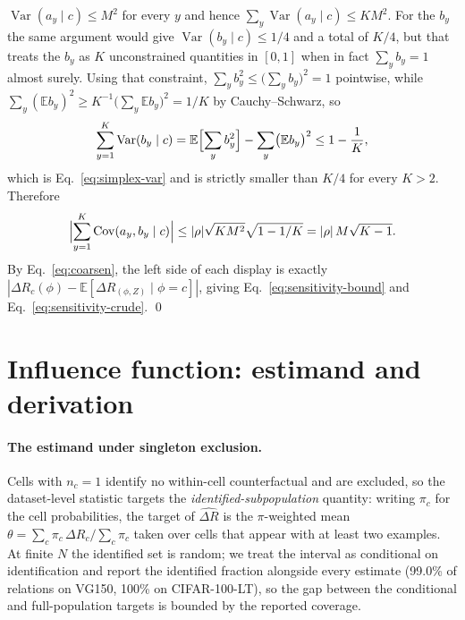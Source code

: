 \documentclass[preprint,times,10pt,a4paper]{elsarticle}
\theoremstyle{plain}
\theoremstyle{definition}
\begin{document}
$\operatorname{Var}(a_y\mid c)\le M^2$ for every $y$ and hence
$\sum_y\operatorname{Var}(a_y\mid c)\le KM^2$. For the $b_y$ the same argument would give
$\operatorname{Var}(b_y\mid c)\le1/4$ and a total of $K/4$, but that treats the $b_y$ as
$K$ unconstrained quantities in $[0,1]$ when in fact $\sum_yb_y=1$ almost surely. Using
that constraint, $\sum_yb_y^2\le\bigl(\sum_yb_y\bigr)^2=1$ pointwise, while
$\sum_y(\mathbb E b_y)^2\ge K^{-1}\bigl(\sum_y\mathbb E b_y\bigr)^2=1/K$ by
Cauchy--Schwarz, so
\[
\sum_{y=1}^K\operatorname{Var}(b_y\mid c)
=\mathbb E\Bigl[\sum_yb_y^2\Bigr]-\sum_y\bigl(\mathbb E b_y\bigr)^2\le1-\frac1K,
\]
which is Eq.~\eqref{eq:simplex-var} and is strictly smaller than $K/4$ for every $K>2$.
Therefore
\[
\Bigl|\sum_{y=1}^K\operatorname{Cov}(a_y,b_y\mid c)\Bigr|
\le|\rho|\sqrt{KM^2}\sqrt{1-1/K}=|\rho|\,M\sqrt{K-1}.
\]
By Eq.~\eqref{eq:coarsen}, the left side of each display is exactly
$|\Delta R_c(\phi)-\mathbb E[\Delta R_{(\phi,Z)}\mid\phi=c]|$, giving
Eq.~\eqref{eq:sensitivity-bound} and Eq.~\eqref{eq:sensitivity-crude}. \qed

\section{Influence function: estimand and derivation}\label{app:influence}

\paragraph{The estimand under singleton exclusion.} Cells with $n_c=1$ identify no
within-cell counterfactual and are excluded, so the dataset-level statistic targets the
\emph{identified-subpopulation} quantity: writing $\pi_c$ for the cell probabilities,
the target of $\widehat{\Delta R}$ is the $\pi$-weighted mean
$\theta=\sum_c\pi_c\,\Delta R_c/\sum_c\pi_c$ taken over cells that appear with at least
two examples. At finite $N$ the identified set is random; we treat the interval as
conditional on identification and report the identified fraction alongside every
estimate (99.0\% of relations on VG150, 100\% on CIFAR-100-LT), so the gap between the
conditional and full-population targets is bounded by the reported coverage.
\end{document}
